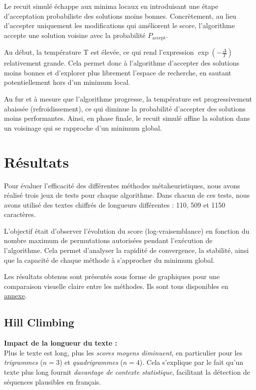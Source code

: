 \documentclass[a4paper]{article}
\begin{document}
Le recuit simulé échappe aux minima locaux en introduisant une étape d'acceptation probabiliste des solutions moins bonnes. Concrètement, au lieu d'accepter uniquement les modifications qui améliorent le score, l'algorithme accepte une solution voisine avec la probabilité $P_{\text{accept}}$.

Au début, la température T est élevée, ce qui rend l'expression $\exp\left(-\frac{\Delta}{T}\right)$ relativement grande. Cela permet donc à l'algorithme d'accepter des solutions moins bonnes et d'explorer plus librement l'espace de recherche, en sautant potentiellement hors d'un minimum local.

Au fur et à mesure que l'algorithme progresse, la température est progressivement abaissée (refroidissement), ce qui diminue la probabilité d'accepter des solutions moins performantes. Ainsi, en phase finale, le recuit simulé affine la solution dans un voisinage qui se rapproche d'un minimum global.
\section{Résultats}

Pour évaluer l’efficacité des différentes méthodes métaheuristiques, nous avons réalisé trois jeux de tests pour chaque algorithme. Dans chacun de ces tests, nous avons utilisé des textes chiffrés de longueurs différentes : 110, 509 et 1150 caractères.

L'objectif était d'observer l’évolution du score (log-vraisemblance) en fonction du nombre maximum de permutations autorisées pendant l'exécution de l'algorithme. Cela permet d’analyser la rapidité de convergence, la stabilité, ainsi que la capacité de chaque méthode à s’approcher du minimum global.

Les résultats obtenus sont présentés sous forme de graphiques pour une comparaison visuelle claire entre les méthodes. Ils sont tous disponibles en \hyperref[sec:annexes]{annexe}.

\subsection{Hill Climbing}

\textbf{Impact de la longueur du texte :} \\
Plus le texte est long, plus les \textit{scores moyens diminuent}, en particulier pour les \textit{trigrammes} ($n = 3$) et \textit{quadrigrammes} ($n = 4$). Cela s’explique par le fait qu’un texte plus long fournit \textit{davantage de contexte statistique}, facilitant la détection de séquences plausibles en français.
\end{document}
